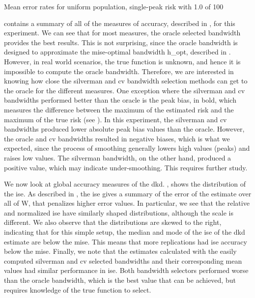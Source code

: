\begin{table}[htbp]
    \centering
    
    \caption[Mean error rates for uniform population single-peak risk]
        {Mean error rates for uniform population, single-peak risk with  1.0 of  100}
    \label{tab:errors:unif_100_1.0_1h}
\end{table}

 contains a summary of all of the measures of accuracy,
described in , for this experiment.
We can see that for most measures, the \gls{oracle} selected bandwidth provides the best results.
This is not surprising, since the \gls{oracle} bandwidth is designed to approximate the \gls{mise}-optimal bandwidth \gls{h_opt},
described in .
However, in real world scenarios, the true function is unknown, and hence it is impossible to compute the \gls{oracle} bandwidth.
Therefore,
we are interested in knowing how close the \gls{silverman} and \gls{cv} bandwidth selection methods can get to the \gls{oracle}
for the different measures.
One exception where the \gls{silverman} and \gls{cv} bandwidths performed better than the \gls{oracle}
is the \gls{peak bias},
in bold,
which measures the difference between the maximum of the estimated risk and the maximum of the true risk
(see ).
In this experiment,
the \gls{silverman} and \gls{cv} bandwidths produced lower absolute \gls{peak bias} values than the \gls{oracle}. 
However, the \gls{oracle} and \gls{cv} bandwidths resulted in negative biases,
which is what we expected,
since the process of smoothing generally lowers high values (peaks) and raises low values.
The \gls{silverman} bandwidth, on the other hand, produced a positive value,
which may indicate under-smoothing.
This requires further study.

We now look at global accuracy measures of the \gls{dkd}.
,
shows the distribution of the \gls{ise}.
As described in ,
the \gls{ise} gives a summary of the error of the estimate over all of \gls{W},
that penalizes higher error values.
In particular, we see that the relative and normalized \gls{ise} have similarly shaped distributions, although the scale is different.
We also observe that the distributions are skewed to the right,
indicating that for this simple setup,
the median and mode of the \gls{ise} of the \gls{dkd} estimate are below the \gls{mise}.
This means that more replications had \gls{ise} accuracy below the \gls{mise}.
Finally, we note that the estimates calculated with the easily computed \gls{silverman} and \gls{cv}
selected bandwidths and their corresponding mean values had similar performance in \gls{ise}.
Both bandwidth selectors performed worse than the \gls{oracle} bandwidth,
which is the best value that can be achieved,
but requires knowledge of the true function to select.

